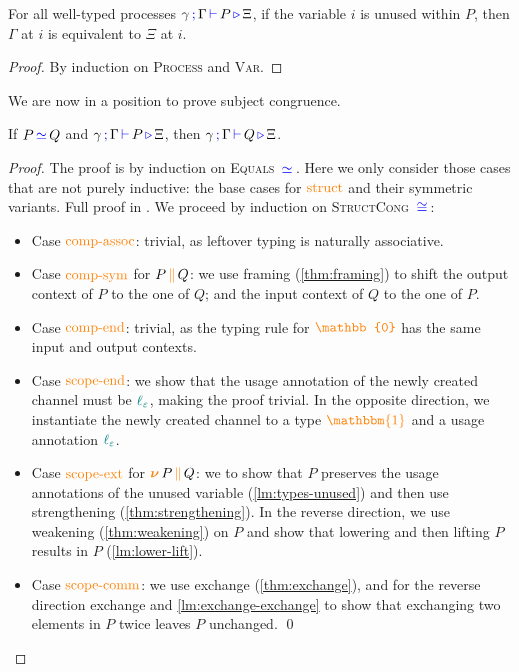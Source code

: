 \documentclass[]{llncs}
\newcommand{\type}[1]{\textcolor{blue}{\operatorname{#1}}}
\newcommand{\constr}[1]{\textcolor{orange}{\operatorname{#1}}}
\newcommand{\func}[1]{\textcolor{teal}{\operatorname{#1}}}
\newcommand{\PO}{\constr{\mathbb{0}}}
\newcommand{\comp}[2]{#1 \, \constr{\parallel} \, #2}
\newcommand{\new}{\constr{\boldsymbol{\nu}} \,}
\newcommand{\unit}{\constr{\mathbbm{1}}}
\newcommand{\lz}{\func{\ell_{\varepsilon}}}
\newcommand{\types}[4]{#1 \, \type{;} \, #2 \, \type{\vdash} \, #3 \, \type{\triangleright} \, #4}
\newcommand{\eq}{\, \type{\simeq} \,}
\newcommand{\eqeq}{\, \type{\cong} \,}
\begin{document}
\begin{nilemma}
  \label{lm:types-unused}
  For all well-typed processes $\types{\gamma}{\Gamma}{P}{\Xi}$, if the variable $i$ is unused within $P$, then $\Gamma$ at $i$ is equivalent to $\Xi$ at $i$.
\end{nilemma}
\begin{proof}
  By induction on \textsc{Process} and \textsc{Var}.
\end{proof}

We are now in a position to prove subject congruence.

\begin{nitheorem}
  \label{thm:subject-congruence}
  If $P \eq{} Q$ and $\types{\gamma}{\Gamma}{P}{\Xi}$, then $\types{\gamma}{\Gamma}{Q}{\Xi}$.
\end{nitheorem}

\begin{proof}[Proof]
  The proof is by induction on \textsc{Equals} $\eq{}$.
  Here we only consider those cases that are not purely inductive: the base cases for $\constr{struct}$ and their symmetric variants.
  Full proof in \cite{Zalakain2020Agda}.
  We proceed by induction on \textsc{StructCong} $\eqeq$:
  \begin{itemize}
    \item
      Case $\constr{comp-assoc}$: trivial, as leftover typing is naturally associative.
    \item
      Case $\constr{comp-sym}$ for $\comp{P}{Q}$: we use framing (\autoref{thm:framing}) to shift the output context of $P$ to the one of $Q$; and the input context of $Q$ to the one of $P$.
    \item
      Case $\constr{comp-end}$: trivial, as the typing rule for $\PO$ has the same input and output contexts.
    \item
      Case $\constr{scope-end}$: we show that the usage annotation of the newly created channel must be $\lz$, making the proof trivial.
      In the opposite direction, we instantiate the newly created channel to a type $\unit$ and a usage annotation $\lz$.
    \item
      Case $\constr{scope-ext}$ for $\new \comp{P}{Q}$: we to show that $P$ preserves the usage annotations of the unused variable (\autoref{lm:types-unused}) and then use strengthening (\autoref{thm:strengthening}).
      In the reverse direction, we use weakening (\autoref{thm:weakening}) on $P$ and show that lowering and then lifting $P$ results in $P$ (\autoref{lm:lower-lift}).
    \item
      Case $\constr{scope-comm}$:
      we use exchange (\autoref{thm:exchange}), and for the reverse direction exchange and \autoref{lm:exchange-exchange} to show that exchanging two elements in $P$ twice leaves $P$ unchanged. \qed
  \end{itemize}
\end{proof}
\end{document}
